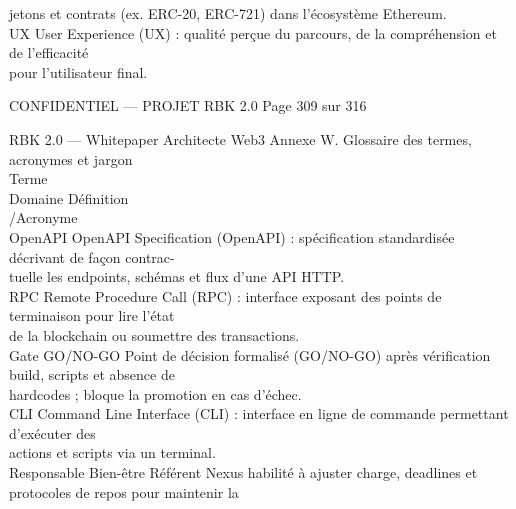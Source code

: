 jetons et contrats (ex. ERC-20, ERC-721) dans l’écosystème Ethereum.\\
\vspace{0.5em}
UX                                      User Experience (UX) : qualité perçue du parcours, de la compréhension et de l’efficacité\\
pour l’utilisateur final.\\
\vspace{0.5em}
\vspace{0.5em}
\vspace{0.5em}
\vspace{0.5em}
\begin{confidential}CONFIDENTIEL — PROJET RBK 2.0                    Page 309 sur 316\end{confidential}
RBK 2.0 — Whitepaper Architecte Web3                                              Annexe W. Glossaire des termes, acronymes et jargon\\
\vspace{0.5em}
\vspace{0.5em}
Terme\\
Domaine    Définition\\
/Acronyme\\
OpenAPI                                 OpenAPI Specification (OpenAPI) : spécification standardisée décrivant de façon contrac-\\
tuelle les endpoints, schémas et flux d’une API HTTP.\\
\vspace{0.5em}
RPC                                     Remote Procedure Call (RPC) : interface exposant des points de terminaison pour lire l’état\\
de la blockchain ou soumettre des transactions.\\
\vspace{0.5em}
Gate GO/NO-GO                           Point de décision formalisé (GO/NO-GO) après vérification build, scripts et absence de\\
hardcodes ; bloque la promotion en cas d’échec.\\
\vspace{0.5em}
CLI                                     Command Line Interface (CLI) : interface en ligne de commande permettant d’exécuter des\\
actions et scripts via un terminal.\\
\vspace{0.5em}
Responsable Bien-être                   Référent Nexus habilité à ajuster charge, deadlines et protocoles de repos pour maintenir la\\
